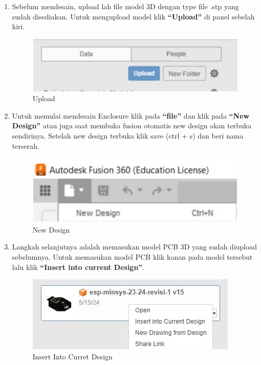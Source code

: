 \begin{enumerate}
    \item Sebelum mendesain, upload lah file model 3D dengan type file .stp yang sudah disediakan. Untuk
    mengupload model klik \textbf{“Upload”} di panel sebelah kiri.
        \begin{figure}[H]
            \centering
            \includegraphics[width=0.5\linewidth]{P3/img/image3.jpg}
            \caption{Upload}
            \label{fig:Upload}
        \end{figure}

    \item Untuk memulai mendesain Enclosure klik pada \textbf{“file”} dan klik pada \textbf{“New Design”} atau juga saat
    membuka fusion otomatis new design akan terbuka sendirinya. Setelah new design terbuka klik
    save (ctrl + s) dan beri nama terserah.
        \begin{figure}[H]
            \centering
            \includegraphics[width=0.5\linewidth]{P3/img/image4.jpg}
            \caption{New Design}
            \label{fig:New Design}
        \end{figure}

    \item Langkah selanjutnya adalah memasukan model PCB 3D yang sudah diupload sebelumnya. Untuk
    memasukan model PCB klik kanan pada model tersebut lalu klik \textbf{“Insert into current Design”}.
        \begin{figure}[H]
            \centering
            \includegraphics[width=0.5\linewidth]{P3/img/Insert to Current Design 2.jpg}
            \caption{Insert Into Curret Design}
            \label{fig:Insert Into Curret Design}
        \end{figure}


\end{enumerate}
